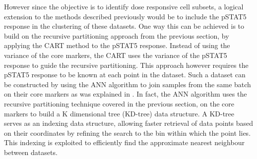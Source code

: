 However since the objective is to identify dose responsive cell subsets,
a logical extension to the methods described previously would be to include the pSTAT5 response
in the clustering of these datasets. 
One way this can be achieved is to build on the recursive partitioning approach from the previous section,
by applying the \acrfull{CART} method to the pSTAT5 response.
Instead of using the variance of the core markers, the \gls{CART} uses the variance of the pSTAT5 response to guide the recursive
partitioning.
This approach however requires the pSTAT5 response to be known at each point in the dataset.
Such a dataset can be constructed by using the \gls{ANN} algorithm to join samples from the same batch on their core markers
as was explained in .
In fact, the \gls{ANN} algorithm uses the recursive partitioning technique covered in the previous section, on the core markers
to build a K dimensional tree (KD-tree) data structure.
A KD-tree
serves as an indexing data structure,
allowing faster retrieval of data points based on their coordinates
by refining the search to the bin within which the point lies.
This indexing is exploited to efficiently find the approximate nearest neighbour between datasets.

